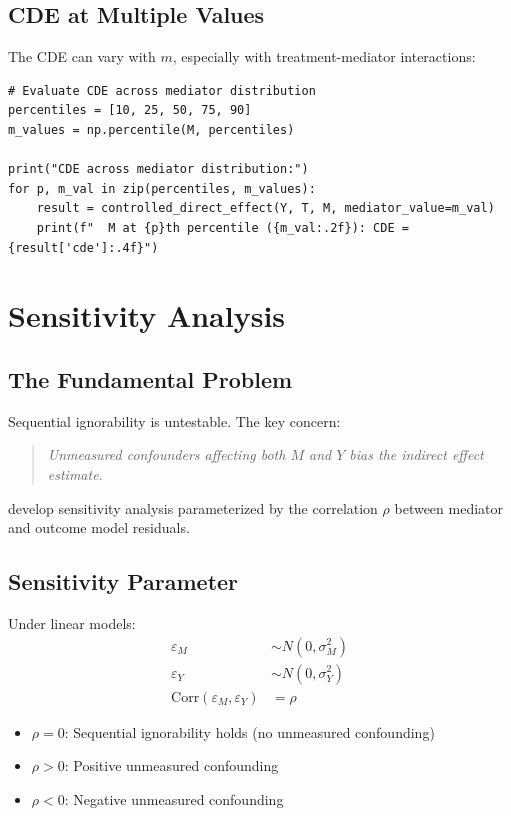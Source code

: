 \subsection{CDE at Multiple Values}

The CDE can vary with $m$, especially with treatment-mediator interactions:

\begin{verbatim}
# Evaluate CDE across mediator distribution
percentiles = [10, 25, 50, 75, 90]
m_values = np.percentile(M, percentiles)

print("CDE across mediator distribution:")
for p, m_val in zip(percentiles, m_values):
    result = controlled_direct_effect(Y, T, M, mediator_value=m_val)
    print(f"  M at {p}th percentile ({m_val:.2f}): CDE = {result['cde']:.4f}")
\end{verbatim}


\section{Sensitivity Analysis}

\subsection{The Fundamental Problem}

Sequential ignorability is untestable. The key concern:

\begin{quote}
\textit{Unmeasured confounders affecting both $M$ and $Y$ bias the indirect effect estimate.}
\end{quote}

\textcite{imai2010general} develop sensitivity analysis parameterized by the correlation $\rho$ between mediator and outcome model residuals.

\subsection{Sensitivity Parameter}

Under linear models:
\begin{align}
\varepsilon_M &\sim N(0, \sigma_M^2) \\
\varepsilon_Y &\sim N(0, \sigma_Y^2) \\
\text{Corr}(\varepsilon_M, \varepsilon_Y) &= \rho
\end{align}

\begin{itemize}
\item $\rho = 0$: Sequential ignorability holds (no unmeasured confounding)
\item $\rho > 0$: Positive unmeasured confounding
\item $\rho < 0$: Negative unmeasured confounding
\end{itemize}

